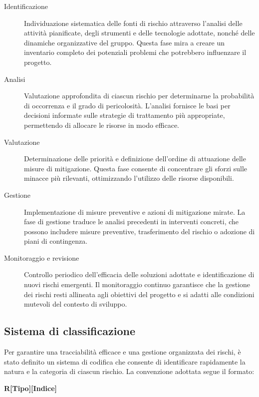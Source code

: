 \documentclass[a4paper, 11pt, oneside]{scrartcl} %
\begin{document}
\begin{description}
    \item[Identificazione] Individuazione sistematica delle fonti di rischio attraverso l'analisi delle attività pianificate, degli strumenti e delle tecnologie adottate, nonché delle dinamiche organizzative del gruppo. Questa fase mira a creare un inventario completo dei potenziali problemi che potrebbero influenzare il progetto.
    
    \item[Analisi] Valutazione approfondita di ciascun rischio per determinarne la probabilità di occorrenza e il grado di pericolosità. L'analisi fornisce le basi per decisioni informate sulle strategie di trattamento più appropriate, permettendo di allocare le risorse in modo efficace.
    
    \item[Valutazione] Determinazione delle priorità e definizione dell'ordine di attuazione delle misure di mitigazione. Questa fase consente di concentrare gli sforzi sulle minacce più rilevanti, ottimizzando l'utilizzo delle risorse disponibili.
    
    \item[Gestione] Implementazione di misure preventive e azioni di mitigazione mirate. La fase di gestione traduce le analisi precedenti in interventi concreti, che possono includere misure preventive, trasferimento del rischio o adozione di piani di contingenza.
    
    \item[Monitoraggio e revisione] Controllo periodico dell'efficacia delle soluzioni adottate e identificazione di nuovi rischi emergenti. Il monitoraggio continuo garantisce che la gestione dei rischi resti allineata agli obiettivi del progetto e si adatti alle condizioni mutevoli del contesto di sviluppo.
\end{description}

\subsection{Sistema di classificazione}

Per garantire una tracciabilità efficace e una gestione organizzata dei rischi, è stato definito un sistema di codifica che consente di identificare rapidamente la natura e la categoria di ciascun rischio. La convenzione adottata segue il formato:

\begin{center}
\textbf{R[Tipo][Indice]}
\end{center}
\end{document}

